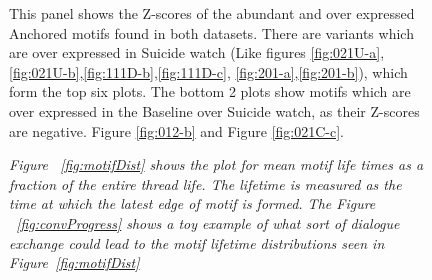 \begin{figure}[!ht]
    \caption{This panel shows the Z-scores of the abundant and over expressed Anchored motifs found in both datasets. There are variants which are over expressed in Suicide watch (Like figures \ref{fig:021U-a},\ref{fig:021U-b},\ref{fig:111D-b},\ref{fig:111D-c}, \ref{fig:201-a},\ref{fig:201-b}), which form the top six plots. The bottom 2 plots show motifs which are over expressed in the Baseline over Suicide watch, as their Z-scores are negative.  Figure \ref{fig:012-b} and Figure \ref{fig:021C-c}.
    }
    \label{Fig:motif_expressed}
\end{figure}


\begin{figure}[!ht]
    \centering
    

     \caption{\textsl{ Figure ~\ref{fig:motifDist} shows the plot for mean motif life times as a fraction of the entire thread life. The lifetime is measured as the time at which the latest edge of motif is formed. The Figure ~\ref{fig:convProgress} shows a toy example of what sort of dialogue exchange could lead to the motif lifetime distributions seen in Figure~\ref{fig:motifDist}}}
     
\end{figure}
     



